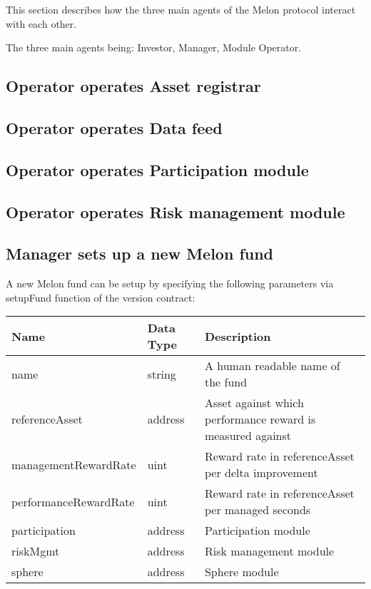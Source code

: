 \documentclass[conference]{IEEEtran}
\begin{document}
This section describes how the three main agents of the Melon protocol interact with each other.

The three main agents being: Investor, Manager, Module Operator.

\subsection{Operator operates Asset registrar}

\subsection{Operator operates Data feed}

\subsection{Operator operates Participation module}

\subsection{Operator operates Risk management module}

\subsection{Manager sets up a new Melon fund}

A new Melon fund can be setup by specifying the following parameters via setupFund function of the version contract:

\begin{center}
		\footnotesize
		\begin{tabular}{ | p{2.7cm} | p{0.8cm} | p{4cm} | }
		\hline
		Name & Data Type & Description \\ \hline
		name & string & A human readable name of the fund \\ \hline
		referenceAsset & address & Asset against which performance reward is measured against \\ \hline
		managementRewardRate & uint	& Reward rate in referenceAsset per delta improvement \\ \hline
		performanceRewardRate & uint & Reward rate in referenceAsset per managed seconds \\ \hline
		participation & address	& Participation module \\ \hline
		riskMgmt & address & Risk management module \\ \hline
		sphere & address & Sphere module \\ \hline
		\end{tabular}
\end{center}
\end{document}
